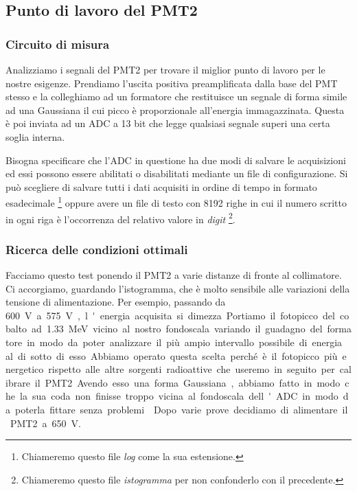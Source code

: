\subsection{Punto di lavoro del PMT2}

\subsubsection{Circuito di misura}
Analizziamo i segnali del PMT2 per trovare il miglior punto di lavoro per le nostre esigenze. Prendiamo l'uscita positiva preamplificata dalla base del PMT stesso e la colleghiamo ad un formatore che restituisce un segnale di forma simile ad una  Gaussiana il cui picco è proporzionale all'energia immagazzinata. Questa è poi inviata ad un ADC a 13 bit che legge qualsiasi segnale superi una certa soglia interna.

Bisogna specificare che l'ADC in questione ha due modi di salvare le acquisizioni ed essi possono essere abilitati o disabilitati mediante un file di configurazione. Si può scegliere di salvare tutti i dati acquisiti in ordine di tempo in formato esadecimale%
\footnote{Chiameremo questo file \emph{log} come la sua estensione.}
oppure avere un file di testo con 8192 righe in cui il numero scritto in ogni riga è l'occorrenza del relativo valore in \emph{digit}%
\footnote{Chiameremo questo file \emph{istogramma} per non confonderlo con il precedente.}.

\subsubsection{Ricerca delle condizioni ottimali}

Facciamo questo test ponendo il PMT2 a varie distanze di fronte al collimatore.
Ci accorgiamo, guardando l'istogramma, che è molto sensibile alle variazioni della tensione  di alimentazione. Per esempio, passando da \SI{600}V a \SI{575}V, l'energia acquisita si dimezza. Portiamo il fotopicco del cobalto ad \SI{1.33}{MeV} vicino al nostro fondoscala variando il guadagno del formatore in modo da poter analizzare il più ampio intervallo possibile di energia al di sotto di esso. Abbiamo operato questa scelta perché è il fotopicco più energetico rispetto alle altre sorgenti radioattive che useremo in seguito per calibrare il PMT2. Avendo esso una forma Gaussiana, abbiamo fatto in modo che la sua coda non finisse troppo vicina al fondoscala dell'ADC in modo da poterla fittare senza problemi. 
Dopo varie prove decidiamo di alimentare il PMT2 a \SI{650}V.

